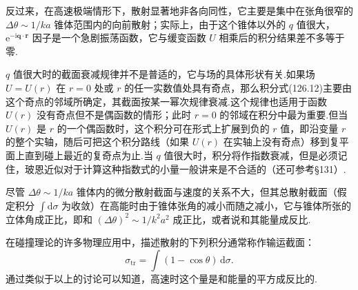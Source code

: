 反过来，在高速极端情形下，散射显著地非各向同性，它主要是集中在张角很窄的 $\Delta\theta\sim1/ka$ 锥体范围内的向前散射；实际上，由于这个锥体以外的 $q$ 值很大，$\mathrm{e}^{-\mathrm{i}\boldsymbol{q}\cdot\boldsymbol{r}}$ 因子是一个急剧振荡函数，它与缓变函数 $U$ 相乘后的积分结果差不多等于零.

$q$ 值很大时的截面衰减规律并不是普适的，它与场的具体形状有关.如果场 $U=U(r)$ 在 $r=0$ 处或 $r$ 的任一实数值处具有奇点，那么积分式(126.12)主要由这个奇点的邻域所确定，其截面按某一幂次规律衰减.这个规律也适用于函数 $U(r)$ 没有奇点但不是偶函数的情形；此时 $r=0$ 的邻域在积分中最为重要.但当 $U(r)$ 是 $r$ 的一个偶函数时，这个积分可在形式上扩展到负的 $r$ 值，即沿变量 $r$ 的整个实轴，随后可把这个积分路线（如果 $U(r)$ 在实轴上没有奇点）移到复平面上直到碰上最近的复奇点为止.当 $q$ 值很大时，积分将作指数衰减，但是必须记住，玻恩近似对于计算这种指数式的小量一般讲来是不合适的（还可参考§131）.

尽管 $\Delta\theta\sim1/ka$ 锥体内的微分散射截面与速度的关系不大，但其总散射截面（假定积分 $\int\mathrm{d}\sigma$ 为收敛）在高能时由于锥体张角的减小而随之减小，它与锥体所张的立体角成正比，即和 $(\Delta\theta)^2\sim1/k^2a^2$ 成正比，或者说和其能量成反比.

在碰撞理论的许多物理应用中，描述散射的下列积分通常称作输运截面：
\begin{equation}
  \sigma_{\mathrm{tr}}=\int(1-\cos\theta)\,\mathrm{d}\sigma.
\end{equation}
通过类似于以上的讨论可以知道，高速时这个量是和能量的平方成反比的.

